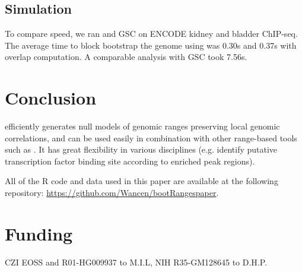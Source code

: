 \subsection{Simulation}

To compare speed, we ran \bootranges and GSC on
ENCODE kidney and bladder ChIP-seq. The average time to
block bootstrap the genome using \bootranges was 0.30s and
0.37s with overlap computation. A comparable analysis with GSC took
7.56s.

\section{Conclusion}

\bootranges efficiently generates null models of genomic ranges preserving 
local genomic correlations, and can be used easily in combination with
other range-based tools such as \plyranges.
It has great flexibility in various disciplines (e.g. identify
putative transcription factor binding site according to enriched peak
regions).

All of the R code and data used in this paper are available at the
following repository: 
\url{https://github.com/Wancen/bootRangespaper}.


\section*{Funding}
CZI EOSS and R01-HG009937 to M.I.L, NIH R35-GM128645 to D.H.P.

